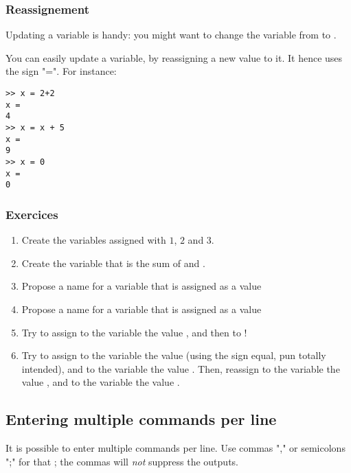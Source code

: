 \subsubsection{Reassignement}
Updating a variable is handy: you might want to change the variable  from  to .

You can easily update a variable, by reassigning a new value to it. It hence uses the sign "=".
For instance:
\begin{lstlisting}
>> x = 2+2
x = 
4
>> x = x + 5
x =
9
>> x = 0
x =
0
\end{lstlisting}

\subsubsection{Exercices}
\begin{enumerate}
	\item Create the variables  assigned with $1$, $2$ and $3$.
	\item Create the variable  that is the sum of  and .
	\item Propose a name for a variable that is assigned as a value 
	\item Propose a name for a variable that is assigned as a value 
	\item Try to assign to the variable  the value , and then to !
	\item Try to assign to the variable  the value  (using the sign equal, pun totally intended), and to the variable  the value .
Then, reassign to the variable  the value , and to the variable  the value .

\end{enumerate}

\subsection{Entering multiple commands per line}
It is possible to enter multiple commands per line. 
Use commas "," or semicolons ";" for that ; the commas will \emph{not} suppress the outputs.



